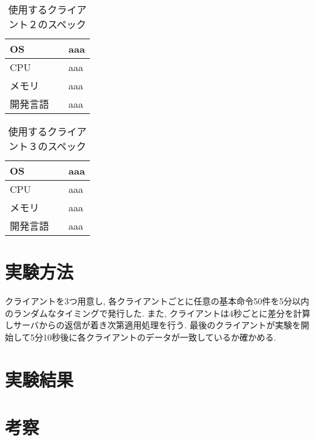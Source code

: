 \begin{table}[htbp]
\begin{center}
	\caption{使用するクライアント２のスペック}
	\begin{tabular}{|l|l|} \hline
		OS & aaa \\ \hline
		CPU & aaa \\ \hline
		メモリ & aaa \\ \hline
    開発言語　& aaa \\ \hline
	\end{tabular}
	\label{client2}
\end{center}
\end{table}

\begin{table}[htbp]
\begin{center}
	\caption{使用するクライアント３のスペック}
	\begin{tabular}{|l|l|} \hline
		OS & aaa \\ \hline
		CPU & aaa \\ \hline
		メモリ & aaa \\ \hline
    開発言語　& aaa \\ \hline
	\end{tabular}
	\label{client3}
\end{center}
\end{table}

\section{実験方法}
クライアントを3つ用意し, 各クライアントごとに任意の基本命令50件を5分以内のランダムなタイミングで発行した. また, クライアントは4秒ごとに差分を計算しサーバからの返信が着き次第適用処理を行う. 最後のクライアントが実験を開始して5分10秒後に各クライアントのデータが一致しているか確かめる.
\section{実験結果}

\section{考察}
